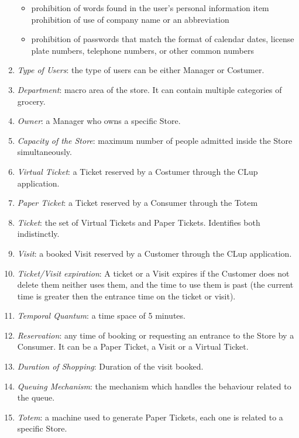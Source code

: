 \documentclass[a4paper, 12pt, oneside]{article}
\begin{document}
\begin{enumerate}[label={D.\arabic{*}}]
\begin{itemize}
    \item prohibition of words found in the user's personal information
    item prohibition of use of company name or an abbreviation
    \item prohibition of passwords that match the format of calendar dates, license plate numbers, telephone numbers, or other common numbers
\end{itemize}
\item \label{def:TypeOfUser}\textit{Type of Users}: the type of users can be either Manager or Costumer.
\item \label{def:department}\textit{Department}: macro area of the store. It can contain multiple categories of grocery.
\item \label{def:owner}\textit{Owner}: a Manager who owns a specific Store.
\item \label{def:capacity}\textit{Capacity of the Store}: maximum number of people admitted inside the Store simultaneously.
\item \label{def:virtualTicket}\textit{Virtual Ticket}: a Ticket reserved by a Costumer through the CLup application.
\item \label{def:paperTicket}\textit{Paper Ticket}: a Ticket reserved by a Consumer through the Totem
\item \label{def:ticket}\textit{Ticket}: the set of Virtual Tickets and Paper Tickets. Identifies both indistinctly.
\item \label{def:visit}\textit{Visit}: a booked Visit reserved by a Customer through the CLup application. 
\item \label{def:expires}\textit{Ticket/Visit expiration}: A ticket or a Visit expires if the Customer does not delete them neither uses them, and the time to use them is past (the current time is greater then the entrance time on the ticket or visit).
\item \label{def:temporalQuantum}\textit{Temporal Quantum}: a time space of 5 minutes.
\item \label{def:reservation}\textit{Reservation}: any time of booking or requesting an entrance to the Store by a Consumer. It can be a Paper Ticket, a Visit or a Virtual Ticket.
\item \label{def:duration}\textit{Duration of Shopping}: Duration of the visit booked.
\item \label{def:queueing}\textit{Queuing Mechanism}: the mechanism which handles the behaviour related to the queue.
\item \label{def:totem}\textit{Totem}: a machine used to generate Paper Tickets, each one is related to a specific Store.

\end{enumerate}
\end{document}
